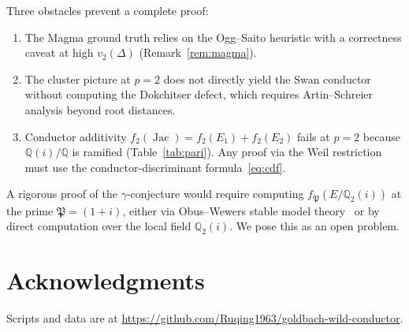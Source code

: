 \documentclass[11pt,a4paper]{article}
\newcommand{\Jac}{\operatorname{Jac}}
\theoremstyle{definition}
\theoremstyle{remark}
\begin{document}
Three obstacles prevent a complete proof:
\begin{enumerate}
\item The Magma ground truth relies on the Ogg--Saito
  heuristic with a correctness caveat at high
  $v_2(\Delta)$ (Remark~\ref{rem:magma}).
\item The cluster picture at $p = 2$ does not directly
  yield the Swan conductor without computing the
  Dokchitser defect, which requires
  Artin--Schreier analysis beyond root distances.
\item Conductor additivity
  $f_2(\Jac) = f_2(E_1) + f_2(E_2)$ fails at $p = 2$
  because $\mathbb{Q}(i)/\mathbb{Q}$ is ramified
  (Table~\ref{tab:pari}).  Any proof via the Weil
  restriction must use the conductor-discriminant
  formula~\eqref{eq:cdf}.
\end{enumerate}
A rigorous proof of the $\gamma$-conjecture
would require computing $f_{\mathfrak{P}}(E/\mathbb{Q}_2(i))$
at the prime $\mathfrak{P} = (1{+}i)$, either via
Obus--Wewers stable model theory~\cite{ObusWewers}
or by direct computation over the local field
$\mathbb{Q}_2(i)$.  We pose this as an open problem.


\section*{Acknowledgments}

Scripts and data are at
\url{https://github.com/Ruqing1963/goldbach-wild-conductor}.
\end{document}
